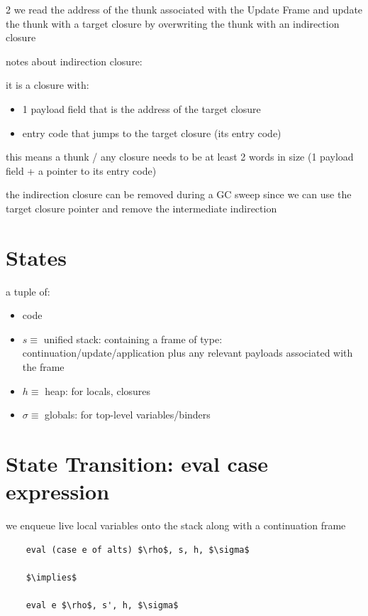\documentclass[8pt]{extarticle}
\begin{document}
\begin{multicols*}{2}
  we read the address of the thunk associated with the Update Frame and update the thunk with a target closure by overwriting the thunk with an indirection closure

  notes about indirection closure:

  it is a closure with:
  \begin{itemize}
  \item 1 payload field that is the address of the target closure
  \item entry code that jumps to the target closure (its entry code)
  \end{itemize}

  this means a thunk / any closure needs to be at least 2 words in size (1 payload field + a pointer to its entry code)

  the indirection closure can be removed during a GC sweep since we can use the target closure pointer and remove the intermediate indirection

  \section{States}

  a tuple of:

  \begin{itemize}
  \item code
  \item $s \equiv$ unified stack: containing a frame of type: continuation/update/application plus any relevant payloads associated with the frame
  \item $h \equiv$ heap: for locals, closures
  \item $\sigma \equiv$ globals: for top-level variables/binders
  \end{itemize}

  \vfill\null
  \columnbreak

  \section{State Transition: eval case expression}

  we enqueue live local variables onto the stack along with a continuation frame
  
  \begin{lstlisting}
    eval (case e of alts) $\rho$, s, h, $\sigma$

    $\implies$

    eval e $\rho$, s', h, $\sigma$


\end{lstlisting}
\end{multicols*}
\end{document}

